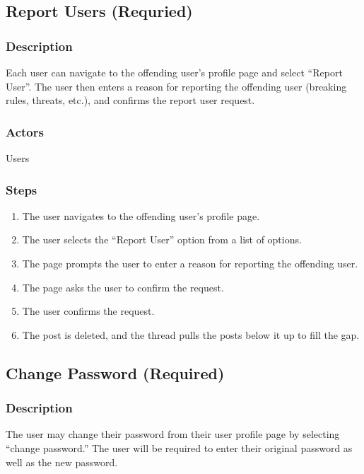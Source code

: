 \documentclass[12pt]{scrartcl}
\begin{document}
\subsection{Report Users (Requried)}
\subsubsection{Description}

Each user can navigate to the offending user’s profile page and select “Report User”. The user then enters a reason for reporting the offending user (breaking rules, threats, etc.), and confirms the report user request.

\subsubsection{Actors}

Users

\subsubsection{Steps}

\begin{enumerate}
\item The user navigates to the offending user’s profile page.
\item The user selects the “Report User” option from a list of options.
\item The page prompts the user to enter a reason for reporting the offending user.
\item The page asks the user to confirm the request.
\item The user confirms the request.
\item The post is deleted, and the thread pulls the posts below it up to fill the gap.
\end{enumerate}


\subsection{Change Password (Required)}
\subsubsection{Description}

The user may change their password from their user profile page by selecting “change password.” The user will be required to enter their original password as well as the new password.
\end{document}
